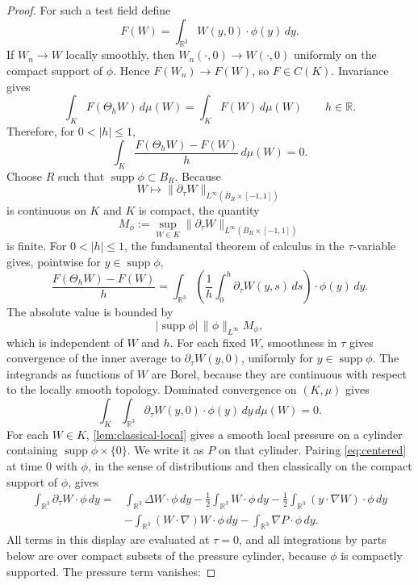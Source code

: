 \documentclass[11pt]{amsart}
\theoremstyle{plain}
\theoremstyle{definition}
\theoremstyle{remark}
\numberwithin{equation}{section}
\begin{document}
\begin{proof}
For such a test field define
\[
   F(W)=\int_{\mathbb R^3}W(y,0)\cdot\phi(y)\,dy .
\]
If \(W_n\to W\) locally smoothly, then \(W_n(\cdot,0)\to W(\cdot,0)\)
uniformly on the compact support of \(\phi\).  Hence \(F(W_n)\to F(W)\), so
\(F\in C(K)\).
Invariance gives
\[
   \int_K F(\Theta_hW)\,d\mu(W)=\int_K F(W)\,d\mu(W)
   \qquad h\in\mathbb R .
\]
Therefore, for \(0<|h|\le1\),
\[
   \int_K \frac{F(\Theta_hW)-F(W)}{h}\,d\mu(W)=0 .
\]
Choose \(R\) such that \(\operatorname{supp}\phi\subset B_R\).  Because
\[
   W\mapsto \|\partial_\tau W\|_{L^\infty(\overline B_R\times[-1,1])}
\]
is continuous on \(K\) and \(K\) is compact, the quantity
\[
   M_\phi:=
   \sup_{W\in K}\|\partial_\tau W\|_{L^\infty(\overline B_R\times[-1,1])}
\]
is finite.  For \(0<|h|\le1\), the fundamental theorem of calculus in the
\(\tau\)-variable gives, pointwise for \(y\in\operatorname{supp}\phi\),
\[
   \frac{F(\Theta_hW)-F(W)}{h}
   =
   \int_{\mathbb R^3}
   \left(\frac1h\int_0^h\partial_\tau W(y,s)\,ds\right)\cdot\phi(y)\,dy .
\]
The absolute value is bounded by
\[
   |\operatorname{supp}\phi|\,\|\phi\|_{L^\infty} M_\phi,
\]
which is independent of \(W\) and \(h\).  For each fixed \(W\), smoothness in
\(\tau\) gives convergence of the inner average to
\(\partial_\tau W(y,0)\), uniformly for \(y\in\operatorname{supp}\phi\).
The integrands as functions of \(W\) are Borel, because they are continuous
with respect to the locally smooth topology.  Dominated convergence on
\((K,\mu)\) gives
\[
   \int_K\int_{\mathbb R^3}\partial_\tau W(y,0)\cdot\phi(y)\,dy\,d\mu(W)=0 .
\]
For each \(W\in K\), \cref{lem:classical-local} gives a smooth local pressure
on a cylinder containing \(\operatorname{supp}\phi\times\{0\}\).  We write it
as \(P\) on that cylinder.  Pairing \eqref{eq:centered} at time \(0\) with
\(\phi\), in the sense of distributions and then classically on the compact
support of \(\phi\), gives
\[
   \begin{aligned}
   \int_{\mathbb R^3}\partial_\tau W\cdot\phi\,dy
   =
   &\int_{\mathbb R^3}\Delta W\cdot\phi\,dy
   -\frac12\int_{\mathbb R^3}W\cdot\phi\,dy
   -\frac12\int_{\mathbb R^3}(y\cdot\nabla W)\cdot\phi\,dy \\
   &-\int_{\mathbb R^3}(W\cdot\nabla)W\cdot\phi\,dy
   -\int_{\mathbb R^3}\nabla P\cdot\phi\,dy .
   \end{aligned}
\]
All terms in this display are evaluated at \(\tau=0\), and all integrations by parts below
are over compact subsets of the pressure cylinder, because \(\phi\) is
compactly supported.  The pressure term vanishes:

\end{proof}
\end{document}
